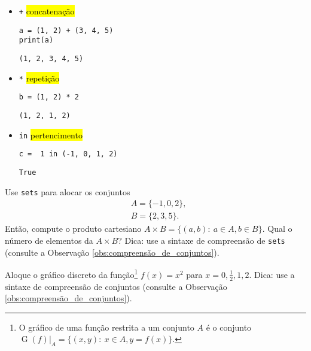 \documentclass[a4paper,10pt,twoside]{article}
\begin{document}
\begin{itemize}
\item[] \texttt{+} \hl{concatenação}

\begin{lstlisting}
a = (1, 2) + (3, 4, 5)
print(a)
\end{lstlisting}

\begin{verbatim}
(1, 2, 3, 4, 5)
\end{verbatim}

\item[] \texttt{*} \hl{repetição}

\begin{lstlisting}
b = (1, 2) * 2
\end{lstlisting}

\begin{verbatim}
(1, 2, 1, 2)
\end{verbatim}

\item[] \texttt{in} \hl{pertencimento}

\begin{lstlisting}
c =  1 in (-1, 0, 1, 2)
\end{lstlisting}

\begin{verbatim}
True
\end{verbatim}

\end{itemize}

\begin{exr}
  Use \texttt{sets} para alocar os conjuntos
  \begin{align}
    &A = \{-1, 0, 2\},\\
    &B = \{2, 3, 5\}.
  \end{align}
  Então, compute o produto cartesiano $A\times B=\{(a,b):~a\in A, b\in B\}$. Qual o número de elementos da $A\times B$? Dica: use a sintaxe de compreensão de \texttt{sets} (consulte a Observação \ref{obs:compreensão_de_conjuntos}).
\end{exr}

\begin{exr}
  Aloque o gráfico discreto da função\footnote{O gráfico de uma função restrita a um conjunto $A$ é o conjunto $\operatorname{G}(f)|_{A} = \{(x,y):~x\in A, y=f(x)\}$.} $f(x) = x^2$ para $x=0, \frac{1}{2}, 1, 2$. Dica: use a sintaxe de compreensão de conjuntos (consulte a Observação \ref{obs:compreensão_de_conjuntos}).
\end{exr}
\end{document}
